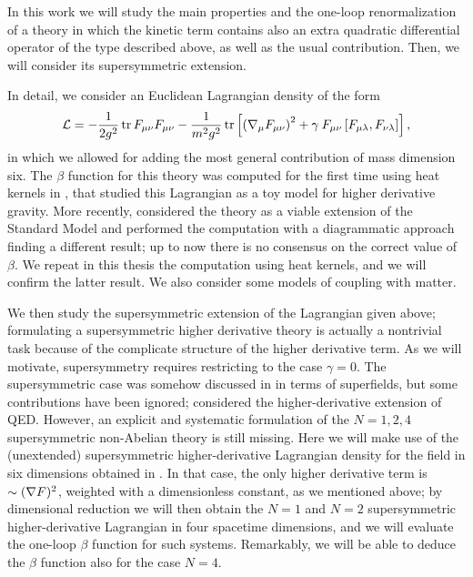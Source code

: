 \vspace{1.5em}

In this work we will study the main properties and the one-loop renormalization of a \ym{} theory in which the kinetic term contains also an extra quadratic differential operator of the type described above, as well as the usual contribution. Then, we will consider its supersymmetric extension. 

In detail, we consider an Euclidean Lagrangian density of the form
\begin{equation*}
\Lagr
	=
- \frac{1}{2 g^2} \tr  F_{\mu\nu} F_{\mu\nu} %
	- \frac{1}{ m^2 g^2 }\tr
		\left[
			 \left( \covD_\mu F_{\mu\nu} \right)^2
			+ \gamma   \: F_{\mu\nu}
				\left[ F_{\mu\lambda},
				F_{\nu\lambda} \right] 
			\right],
\end{equation*}
in which we allowed for adding the most general contribution of mass dimension six. The $\beta$ function for this theory was computed for the first time  using heat kernels in \cite{Fradkin:1981iu}, that studied this Lagrangian as a toy model for higher derivative gravity. More recently, \cite{Grinstein:2008qq,Schuster} considered the theory as a viable extension of the Standard Model and performed the computation with a diagrammatic approach finding a different result; up to now there is no consensus on the correct value of $\beta$.
We repeat in this thesis the computation using heat kernels, and we will confirm the latter result. We also consider some models of coupling with matter.

We then study the supersymmetric extension of the Lagrangian given above; formulating a supersymmetric higher derivative theory is actually a nontrivial task because of the complicate structure of the higher derivative term.  As we will motivate, supersymmetry requires restricting to the case $\gamma = 0$.
The supersymmetric case was somehow discussed in \cite{Buchbinder:1999jn} in terms of superfields, but some contributions have been ignored; \cite{Gama:2011ws} considered the higher-derivative extension of QED. However, an explicit and systematic formulation of the $N=1,2,4$ supersymmetric non-Abelian theory is still missing. Here we will make use of the (unextended) supersymmetric higher-derivative Lagrangian density for the \ym{} field in six dimensions obtained in \cite{Ivanov:2005qf}. In that case, the only  higher derivative term is $\sim  ({ \mathcal{\nabla} } F)^2 $, weighted with a dimensionless constant,  as we mentioned above; by dimensional reduction  we will then obtain the $N=1$ and $N=2$ supersymmetric higher-derivative \sym{}  Lagrangian in four spacetime dimensions, and we will evaluate the one-loop $\beta$ function for such systems. Remarkably, we will be able to deduce the $\beta$ function also for the case $N=4$.





